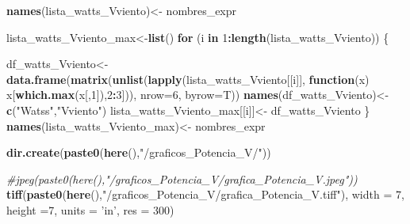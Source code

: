 \documentclass[]{article}
\newenvironment{Shaded}{\begin{snugshade}}{\end{snugshade}}
\newcommand{\KeywordTok}[1]{\textcolor[rgb]{0.13,0.29,0.53}{\textbf{#1}}}
\newcommand{\DataTypeTok}[1]{\textcolor[rgb]{0.13,0.29,0.53}{#1}}
\newcommand{\DecValTok}[1]{\textcolor[rgb]{0.00,0.00,0.81}{#1}}
\newcommand{\StringTok}[1]{\textcolor[rgb]{0.31,0.60,0.02}{#1}}
\newcommand{\CommentTok}[1]{\textcolor[rgb]{0.56,0.35,0.01}{\textit{#1}}}
\newcommand{\ControlFlowTok}[1]{\textcolor[rgb]{0.13,0.29,0.53}{\textbf{#1}}}
\newcommand{\OperatorTok}[1]{\textcolor[rgb]{0.81,0.36,0.00}{\textbf{#1}}}
\newcommand{\NormalTok}[1]{#1}
\begin{document}
\begin{Shaded}
\begin{Highlighting}[]
{{{{  \KeywordTok{names}\NormalTok{(lista_watts_Vviento)<-}\StringTok{ }\NormalTok{nombres_expr}
  
\NormalTok{  lista_watts_Vviento_max<-}\KeywordTok{list}\NormalTok{()}
  \ControlFlowTok{for}\NormalTok{ (i }\ControlFlowTok{in} \DecValTok{1}\OperatorTok{:}\KeywordTok{length}\NormalTok{(lista_watts_Vviento)) \{}
    
\NormalTok{    df_watts_Vviento<-}\StringTok{ }\KeywordTok{data.frame}\NormalTok{(}\KeywordTok{matrix}\NormalTok{(}\KeywordTok{unlist}\NormalTok{(}\KeywordTok{lapply}\NormalTok{(lista_watts_Vviento[[i]],}
                                                       \ControlFlowTok{function}\NormalTok{(x) x[}\KeywordTok{which.max}\NormalTok{(x[,}\DecValTok{1}\NormalTok{]),}\DecValTok{2}\OperatorTok{:}\DecValTok{3}\NormalTok{])),}
                                         \DataTypeTok{nrow=}\DecValTok{6}\NormalTok{, }\DataTypeTok{byrow=}\NormalTok{T))}
    \KeywordTok{names}\NormalTok{(df_watts_Vviento)<-}\StringTok{ }\KeywordTok{c}\NormalTok{(}\StringTok{"Watss"}\NormalTok{,}\StringTok{"Vviento"}\NormalTok{)}
\NormalTok{    lista_watts_Vviento_max[[i]]<-}\StringTok{ }\NormalTok{df_watts_Vviento}
\NormalTok{  \}}
  \KeywordTok{names}\NormalTok{(lista_watts_Vviento_max)<-}\StringTok{ }\NormalTok{nombres_expr}
  
  \KeywordTok{dir.create}\NormalTok{(}\KeywordTok{paste0}\NormalTok{(}\KeywordTok{here}\NormalTok{(),}\StringTok{"/graficos_Potencia_V/"}\NormalTok{))}
  
  \CommentTok{#jpeg(paste0(here(),"/graficos_Potencia_V/grafica_Potencia_V.jpeg"))}
  \KeywordTok{tiff}\NormalTok{(}\KeywordTok{paste0}\NormalTok{(}\KeywordTok{here}\NormalTok{(),}\StringTok{"/graficos_Potencia_V/grafica_Potencia_V.tiff"}\NormalTok{), }\DataTypeTok{width =} \DecValTok{7}\NormalTok{, }\DataTypeTok{height =}\DecValTok{7}\NormalTok{, }\DataTypeTok{units =} \StringTok{'in'}\NormalTok{, }\DataTypeTok{res =} \DecValTok{300}\NormalTok{)}
  
}}}}
\end{Highlighting}
\end{Shaded}
\end{document}
